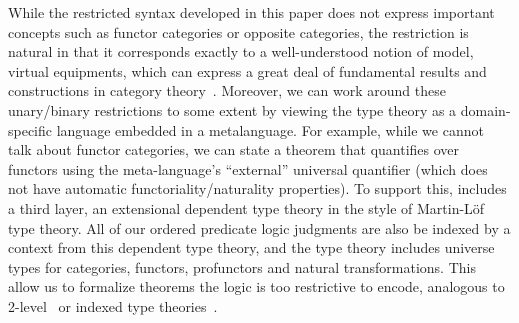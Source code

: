 \documentclass{llncs}
\begin{document}
While the restricted syntax developed in this paper does not express
important concepts such as functor categories or opposite categories,
the restriction is natural in that it corresponds exactly to a
well-understood notion of model, virtual equipments, which can express a
great deal of fundamental results and constructions in category
theory~\cite{elements-of-oo-category-theory,
  enriched-indexed-categories}.
%
Moreover, we can work around these unary/binary restrictions to some
extent by viewing the type theory as a domain-specific language embedded
in a metalanguage.  For example, while we cannot talk about functor
categories, we can state a theorem that quantifies over functors using
the meta-language's ``external'' universal quantifier (which does not
have automatic functoriality/naturality properties).  To support this,
\vett includes a third layer, an extensional dependent type theory in
the style of Martin-L\"of type theory. All of our ordered predicate
logic judgments are also be indexed by a context from this dependent
type theory, and the type theory includes universe types for categories,
functors, profunctors and natural transformations.  This allow us to
formalize theorems the logic is too restrictive to encode, analogous to
2-level~\cite{voevodsky13hts,altenkirch+16strict} or indexed type
theories~\cite{isaev21indexed,cervesatopfenning02llf,vakar15linear,krishnaswami+15linear}.

\end{document}
